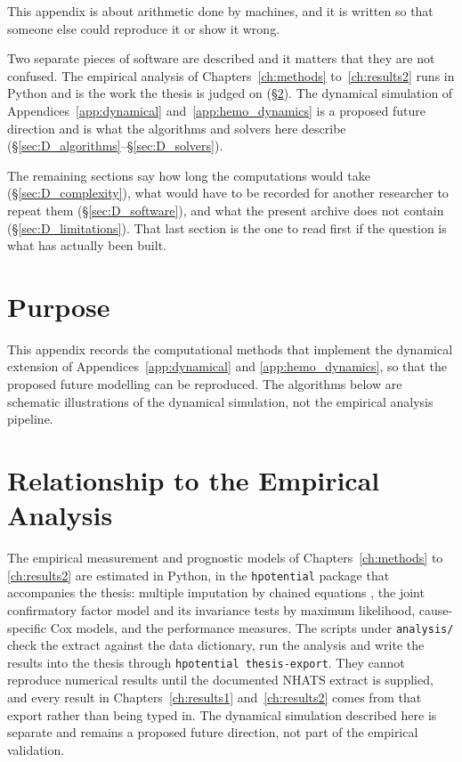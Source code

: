 
\label{app:computation}

\begin{ataglance}
This appendix is about arithmetic done by machines, and it is written so that
someone else could reproduce it or show it wrong.

Two separate pieces of software are described and it matters that they are not
confused. The empirical analysis of Chapters~\ref{ch:methods}
to~\ref{ch:results2} runs in Python and is the work the thesis is judged on
(\S\ref{sec:D_relationship}). The dynamical simulation of
Appendices~\ref{app:dynamical} and~\ref{app:hemo_dynamics} is a proposed future
direction and is what the algorithms and solvers here describe
(\S\ref{sec:D_algorithms}--\S\ref{sec:D_solvers}).

The remaining sections say how long the computations would take
(\S\ref{sec:D_complexity}), what would have to be recorded for another
researcher to repeat them (\S\ref{sec:D_software}), and what the present
archive does not contain (\S\ref{sec:D_limitations}). That last section is the
one to read first if the question is what has actually been built.
\end{ataglance}

\section{Purpose}
\label{sec:D_purpose}
This appendix records the computational methods that implement the dynamical
extension of Appendices~\ref{app:dynamical} and \ref{app:hemo_dynamics}, so that
the proposed future modelling can be reproduced. The algorithms below are
schematic illustrations of the dynamical simulation, not the empirical analysis
pipeline.

\section{Relationship to the Empirical Analysis}
\label{sec:D_relationship}
The empirical measurement and prognostic models of Chapters~\ref{ch:methods} to
\ref{ch:results2} are estimated in Python, in the \texttt{hpotential} package
that accompanies the thesis: multiple imputation by chained equations
\citep{vanbuuren_2011}, the joint confirmatory factor model and its invariance
tests by maximum likelihood, cause-specific Cox models, and the performance
measures. The scripts under \texttt{analysis/} check the extract against the
data dictionary, run the analysis and write the results into the thesis
through \texttt{hpotential thesis-export}. They cannot reproduce numerical
results until the documented NHATS extract is supplied, and every result in
Chapters~\ref{ch:results1} and~\ref{ch:results2} comes from that export
rather than being typed in. The dynamical simulation described
here is separate and remains a proposed future direction, not part of the
empirical validation.

